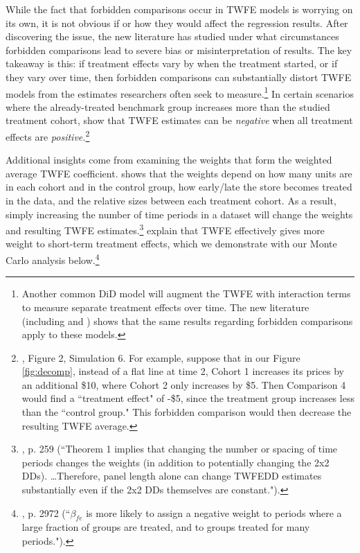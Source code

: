 \documentclass[12pt]{article}
\begin{document}
While the fact that forbidden comparisons occur in TWFE models is worrying on its own, it is not obvious if or how they would affect the regression results. After discovering the issue, the new literature has studied under what circumstances forbidden comparisons lead to severe bias or misinterpretation of results. The key takeaway is this: if treatment effects vary by when the treatment started, or if they vary over time, then forbidden comparisons can substantially distort TWFE models from the estimates researchers often seek to measure.\footnote{Another common DiD model will augment the TWFE with interaction terms to measure separate treatment effects over time. The new literature (including \citet{sunabr2021a} and \citet{borusyak2024revisiting}) shows that the same results regarding forbidden comparisons apply to these models.} In certain scenarios where the already-treated benchmark group increases more than the studied treatment cohort, \citet{baker2022much} show that TWFE estimates can be \textit{negative} when all treatment effects are \textit{positive.}\footnote{\citet{baker2022much}, Figure 2, Simulation 6. For example, suppose that in our Figure \ref{fig:decomp}, instead of a flat line at time 2, Cohort 1 increases its prices by an additional \$10, where Cohort 2 only increases by \$5. Then Comparison 4 would find a ``treatment effect" of -\$5, since the treatment group increases less than the ``control group." This forbidden comparison would then decrease the resulting TWFE average.} 

Additional insights come from examining the weights that form the weighted average TWFE coefficient. \citet{goodman-bacon2021a} shows that the weights depend on how many units are in each cohort and in the control group, how early/late the store becomes treated in the data, and the relative sizes between each treatment cohort. As a result, simply increasing the number of time periods in a dataset will change the weights and resulting TWFE estimates.\footnote{\citet{goodman-bacon2021a}, p. 259 (``Theorem 1 implies that changing the number or spacing of time periods changes the weights (in addition to potentially changing the 2x2 DDs). \ldots Therefore, panel length alone can change TWFEDD estimates substantially even if the 2x2 DDs themselves are constant.").} \citet{de2020two} explain that TWFE effectively gives more weight to short-term treatment effects, which we demonstrate with our Monte Carlo analysis below.\footnote{\citet{de2020two}, p. 2972 (``$\beta_{fe}$ is more likely to assign a negative weight to periods where a large fraction of groups are treated, and to groups treated for many periods.").}
\end{document}
